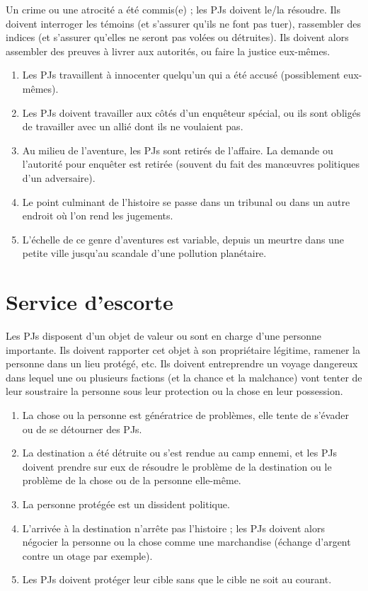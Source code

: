 \begin{multicols}{2}

Un crime ou une atrocité a été commis(e) ; les PJs doivent le/la résoudre. Ils doivent interroger les témoins (et s'assurer qu'ils ne font pas tuer), rassembler des indices (et s'assurer qu'elles ne seront pas volées ou détruites). Ils doivent alors assembler des preuves à livrer aux autorités, ou faire la justice eux-mêmes.

\themes
\begin{enumerate}
\item Les PJs travaillent à innocenter quelqu'un qui a été accusé (possiblement eux-mêmes).
\item Les PJs doivent travailler aux côtés d'un enquêteur spécial, ou ils sont obligés de travailler avec un allié dont ils ne voulaient pas.
\item Au milieu de l'aventure, les PJs sont retirés de l'affaire. La demande ou l'autorité pour enquêter est retirée (souvent du fait des manœuvres politiques d'un adversaire).
\item Le point culminant de l'histoire se passe dans un tribunal ou dans un autre endroit où l'on rend les jugements.
\item L'échelle de ce genre d'aventures est variable, depuis un meurtre dans une petite ville jusqu'au scandale d'une pollution planétaire.
\end{enumerate}

\section{Service d'escorte}
\label{escorte}


Les PJs disposent d'un objet de valeur ou sont en charge d'une personne importante. Ils doivent rapporter cet objet à son propriétaire légitime, ramener la personne dans un lieu protégé, etc. Ils doivent entreprendre un voyage dangereux dans lequel une ou plusieurs factions (et la chance et la malchance) vont tenter de leur soustraire la personne sous leur protection ou la chose en leur possession.

\themes
\begin{enumerate}
\item La chose ou la personne est génératrice de problèmes, elle tente de s'évader ou de se détourner des PJs.
\item La destination a été détruite ou s'est rendue au camp ennemi, et les PJs doivent prendre sur eux de résoudre le problème de la destination ou le problème de la chose ou de la personne elle-même.
\item La personne protégée est un dissident politique.
\item L'arrivée à la destination n'arrête pas l'histoire ; les PJs doivent alors négocier la personne ou la chose comme une marchandise (échange d'argent contre un otage par exemple).
\item Les PJs doivent protéger leur cible sans que le cible ne soit au courant.
\end{enumerate}


\end{multicols}
